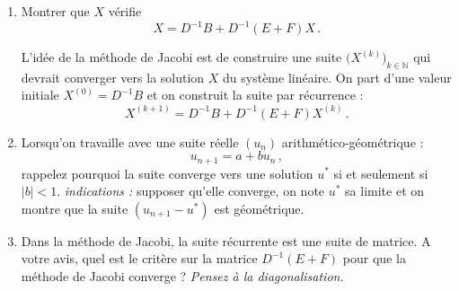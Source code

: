 \begin{enumerate}
    \item Montrer que $X$ vérifie 
    \[
        X = D^{-1}B + D^{-1}(E + F) X\,.
    \]

    \vspace{1em}
    L'idée de la méthode de Jacobi est de construire une suite $\Big(X^{(k)}\Big)_{k \in \mathbb{N}}$ qui devrait converger vers la solution $X$ du système linéaire.
    On part d'une valeur initiale $X^{(0)} = D^{-1}B$ et on construit la suite par récurrence :
    \[
        X^{(k+1)} = D^{-1}B + D^{-1}(E + F) X^{(k)}\,.
    \]
    \item Lorsqu'on travaille avec une suite réelle $(u_n)$ arithmético-géométrique : 
    \[
        u_{n+1} = a + b u_n\,,
    \]
    rappelez pourquoi la suite converge vers une solution $u^*$ si et seulement si $|b| < 1$.\newline
    \textit{indications :} supposer qu'elle converge, on note $u^*$ sa limite et on montre que la suite $(u_{n+1} - u^*)$ est géométrique.


    \item Dans la méthode de Jacobi, la suite récurrente est une suite de matrice. A votre avis, quel est le critère sur la matrice $D^{-1}(E + F)$ pour que la méthode de Jacobi converge ?
    \textit{Pensez à la diagonalisation.}


\end{enumerate}
